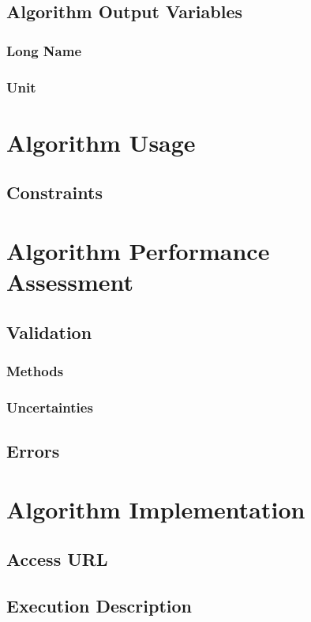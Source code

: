 \documentclass[12pt]{article}
\begin{document}
\subsection{Algorithm Output Variables}
\AlgorithmOutputVariables

\subsubsection{Long Name}
\AlgorthimOutputVariablesLongName

\subsubsection{Unit}
\AlgorthimOutputVariablesUnit

\section{Algorithm Usage}
\AlgorithmUsage

\subsection{Constraints}
\Constraints

\section{Algorithm Performance Assessment}
\AlgorithmPerformanceAssessment

\subsection{Validation}
\subsubsection{Methods}
\Methods
\subsubsection{Uncertainties}
\Uncertainties
\subsection{Errors}
\Errors

\section{Algorithm Implementation}
\AlgorithmImplementation
\subsection{Access URL}
\AccessURL
\subsection{Execution Description}
\ExecutionDescription



\end{document}
